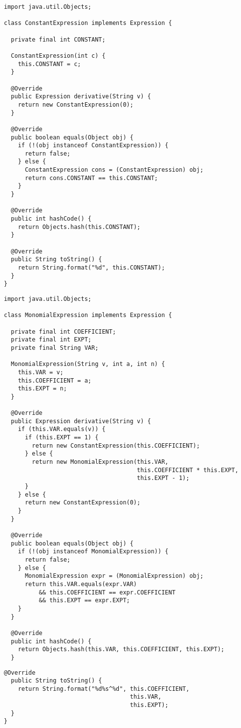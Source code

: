 \begin{lstlisting}[language=MyJava]
import java.util.Objects;

class ConstantExpression implements Expression {

  private final int CONSTANT;

  ConstantExpression(int c) { 
    this.CONSTANT = c; 
  }

  @Override
  public Expression derivative(String v) { 
    return new ConstantExpression(0); 
  }

  @Override
  public boolean equals(Object obj) {
    if (!(obj instanceof ConstantExpression)) { 
      return false; 
    } else { 
      ConstantExpression cons = (ConstantExpression) obj;
      return cons.CONSTANT == this.CONSTANT; 
    }
  }

  @Override
  public int hashCode() { 
    return Objects.hash(this.CONSTANT); 
  }

  @Override
  public String toString() { 
    return String.format("%d", this.CONSTANT); 
  }
}
\end{lstlisting}

\begin{lstlisting}[language=MyJavaNF]
import java.util.Objects;

class MonomialExpression implements Expression {

  private final int COEFFICIENT;
  private final int EXPT;
  private final String VAR;

  MonomialExpression(String v, int a, int n) { 
    this.VAR = v;
    this.COEFFICIENT = a;
    this.EXPT = n;
  }

  @Override
  public Expression derivative(String v) { 
    if (this.VAR.equals(v)) {
      if (this.EXPT == 1) {
        return new ConstantExpression(this.COEFFICIENT);
      } else {
        return new MonomialExpression(this.VAR, 
                                      this.COEFFICIENT * this.EXPT, 
                                      this.EXPT - 1);
      }
    } else {
      return new ConstantExpression(0);
    } 
  }

  @Override
  public boolean equals(Object obj) {
    if (!(obj instanceof MonomialExpression)) { 
      return false; 
    } else { 
      MonomialExpression expr = (MonomialExpression) obj;
      return this.VAR.equals(expr.VAR)
          && this.COEFFICIENT == expr.COEFFICIENT 
          && this.EXPT == expr.EXPT;
    }
  }

  @Override
  public int hashCode() { 
    return Objects.hash(this.VAR, this.COEFFICIENT, this.EXPT); 
  }
\end{lstlisting}
\begin{lstlisting}[language=MyJavaNF]
  @Override
  public String toString() { 
    return String.format("%d%s^%d", this.COEFFICIENT, 
                                    this.VAR, 
                                    this.EXPT); 
  }
}
\end{lstlisting}

